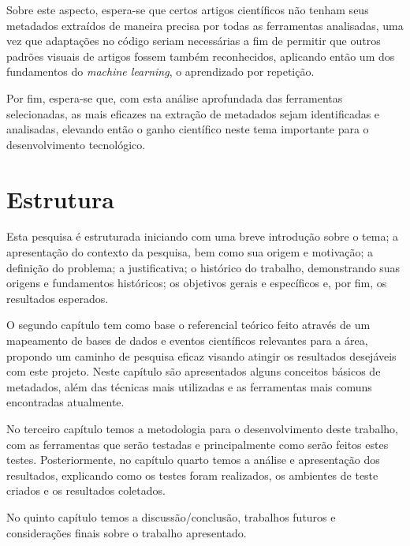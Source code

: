 Sobre este aspecto, espera-se que certos artigos científicos não tenham seus metadados extraídos de maneira precisa por todas as ferramentas analisadas, uma vez que adaptações no código seriam necessárias a fim de permitir que outros padrões visuais de artigos fossem também reconhecidos, aplicando então um dos fundamentos do \textit{machine learning}, o aprendizado por repetição. 

Por fim, espera-se que, com esta análise aprofundada das ferramentas selecionadas, as mais eficazes na extração de metadados sejam identificadas e analisadas, elevando então o ganho científico neste tema importante para o desenvolvimento tecnológico.


\section{Estrutura}
\label{sec:structure}

Esta pesquisa é estruturada iniciando com uma breve introdução sobre o tema; a apresentação do contexto da pesquisa, bem como sua origem e motivação; a definição do problema; a justificativa; o histórico do trabalho, demonstrando suas origens e fundamentos históricos; os objetivos gerais e específicos e, por fim, os resultados esperados.

O segundo capítulo tem como base o referencial teórico feito através de um mapeamento de bases de dados e eventos científicos relevantes para a área, propondo um caminho de pesquisa eficaz visando atingir os resultados desejáveis com este projeto. Neste capítulo são apresentados alguns conceitos básicos de metadados, além das técnicas mais utilizadas e as ferramentas mais comuns encontradas atualmente.

No terceiro capítulo temos a metodologia para o desenvolvimento deste trabalho, com as ferramentas que serão testadas e principalmente como serão feitos estes testes. Posteriormente, no capítulo quarto temos a análise e apresentação dos resultados, explicando como os testes foram realizados, os ambientes de teste criados e os resultados coletados.

No quinto capítulo temos a discussão/conclusão, trabalhos futuros e considerações finais sobre o trabalho apresentado.


